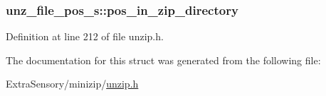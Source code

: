 \hypertarget{structunz__file__pos__s_a87d193346d3825363f899f574a2f3cb2}{
\subsubsection[{pos\+\_\+in\+\_\+zip\+\_\+directory}]{ unz\+\_\+file\+\_\+pos\+\_\+s\+::pos\+\_\+in\+\_\+zip\+\_\+directory}}\label{structunz__file__pos__s_a87d193346d3825363f899f574a2f3cb2}


Definition at line 212 of file unzip.\+h.



The documentation for this struct was generated from the following file\+:\begin{DoxyCompactItemize}
\item 
Extra\+Sensory/minizip/\hyperlink{unzip_8h}{unzip.\+h}\end{DoxyCompactItemize}
